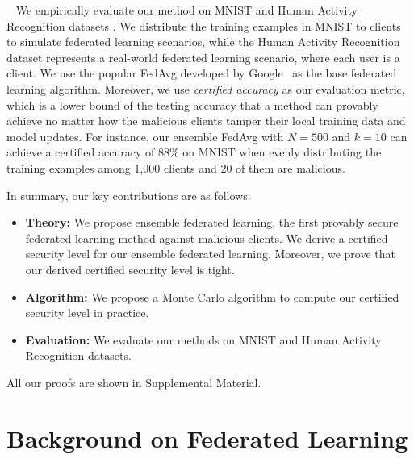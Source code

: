 \documentclass[letterpaper]{article} %
\newcommand{\myparatight}[1]{\smallskip\noindent{\bf {#1}:}~}
\begin{document}
\myparatight{Evaluation} We empirically evaluate our method on MNIST \cite{lecun2010mnist} and Human Activity Recognition datasets \cite{anguita2013public}. We distribute the training examples in MNIST to clients to simulate  federated learning scenarios, while the Human Activity Recognition dataset represents a real-world federated learning scenario, where each user is a client. We use the popular FedAvg developed by Google~\cite{mcmahan2016communication} as the base federated learning algorithm. Moreover, we use \emph{certified accuracy} as our evaluation metric, which is a lower bound of the testing accuracy that a method can provably achieve no matter how the malicious clients tamper their local training data and model updates. For instance, our ensemble FedAvg with $N=500$ and $k=10$ can achieve a certified accuracy of 88\% on MNIST when evenly distributing the training examples among 1,000 clients and 20 of them are malicious.  

In summary, our key contributions are as follows:
\begin{itemize}
\item {\bf Theory:} We propose ensemble federated learning, the first provably secure federated learning method against malicious clients. We derive a certified security level for our ensemble federated learning. Moreover, we prove that our derived certified security level is tight.
\item {\bf Algorithm:} We propose a Monte Carlo algorithm to compute our certified security level in practice. 
\item {\bf Evaluation:} We evaluate our methods on MNIST and Human Activity Recognition datasets.
\end{itemize}

All our proofs are shown in Supplemental Material. 



\section{Background on Federated Learning}
\end{document}
